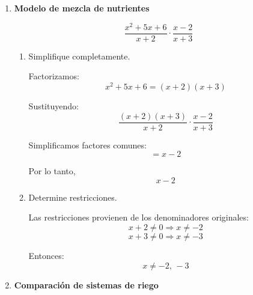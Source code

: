 \documentclass[11pt]{article}
\begin{document}
\begin{enumerate}
\begin{enumerate}[label=\alph*)]
		\newpage	
		
		\vspace*{0.5em}
		
		Desarrollamos:
		\[
		(x+2)(x+1)=x^2+3x+2
		\]
		\[
		3x(x-3)=3x^2-9x
		\]
		
		Luego:
		\[
		\frac{x^2+3x+2-(3x^2-9x)}{(x-3)(x+1)}
		=
		\frac{x^2+3x+2-3x^2+9x}{(x-3)(x+1)}
		\]
		\[
		=
		\frac{-2x^2+12x+2}{(x-3)(x+1)}
		\]
		
		Por lo tanto:
		\[
		\boxed{\frac{-2x^2+12x+2}{(x-3)(x+1)}}
		\]
		
		\item Determine restricciones.
		
		Los valores que anulan los denominadores son:
		\[
		x-3\neq 0 \Rightarrow x\neq 3
		\]
		\[
		x+1\neq 0 \Rightarrow x\neq -1
		\]
		
		Así,
		\[
		\boxed{x\neq 3,\,-1}
		\]
		
		\end{enumerate}
	
	\item \textbf{Modelo de mezcla de nutrientes}
	
		\[
		\frac{x^2+5x+6}{x+2}\cdot\frac{x-2}{x+3}
		\]
	
		\begin{enumerate}[label=\alph*)]
		\item Simplifique completamente.
		
		Factorizamos:
		\[
		x^2+5x+6=(x+2)(x+3)
		\]
		
		Sustituyendo:
		\[
		\frac{(x+2)(x+3)}{x+2}\cdot\frac{x-2}{x+3}
		\]
		
		Simplificamos factores comunes:
		\[
		= x-2
		\]
		
		Por lo tanto,
		\[
		\boxed{x-2}
		\]
		
		\item Determine restricciones.
		
		Las restricciones provienen de los denominadores originales:
		\[
		x+2\neq 0 \Rightarrow x\neq -2
		\]
		\[
		x+3\neq 0 \Rightarrow x\neq -3
		\]
		
		Entonces:
		\[
		\boxed{x\neq -2,\,-3}
		\]
		
		\end{enumerate}
	
	\newpage	
	
	\vspace*{0.5em}
	
	\item \textbf{Comparación de sistemas de riego}
	

\end{enumerate}
\end{document}
